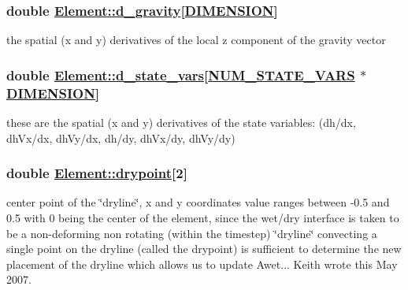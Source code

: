 \hypertarget{classElement_r41}{
\subsubsection[d\_\-gravity]{\setlength{\rightskip}{0pt plus 5cm}double \hyperlink{classElement_r41}{Element::d\_\-gravity}\mbox{[}\hyperlink{constant_8h_a15}{DIMENSION}\mbox{]}}}
\label{classElement_r41}


the spatial (x and y) derivatives of the local z component of the gravity vector 

\hypertarget{classElement_r30}{
\subsubsection[d\_\-state\_\-vars]{\setlength{\rightskip}{0pt plus 5cm}double \hyperlink{classElement_r30}{Element::d\_\-state\_\-vars}\mbox{[}\hyperlink{constant_8h_a45}{NUM\_\-STATE\_\-VARS} $\ast$\hyperlink{constant_8h_a15}{DIMENSION}\mbox{]}}}
\label{classElement_r30}


these are the spatial (x and y) derivatives of the state variables: (dh/dx, dh\-Vx/dx, dh\-Vy/dx, dh/dy, dh\-Vx/dy, dh\-Vy/dy) 

\hypertarget{classElement_r52}{
\subsubsection[drypoint]{\setlength{\rightskip}{0pt plus 5cm}double \hyperlink{classElement_r52}{Element::drypoint}\mbox{[}2\mbox{]}}}
\label{classElement_r52}


center point of the \char`\"{}dryline\char`\"{}, x and y coordinates value ranges between -0.5 and 0.5 with 0 being the center of the element, since the wet/dry interface is taken to be a non-deforming non rotating (within the timestep) \char`\"{}dryline\char`\"{} convecting a single point on the dryline (called the drypoint) is sufficient to determine the new placement of the dryline which allows us to update Awet... Keith wrote this May 2007. 

